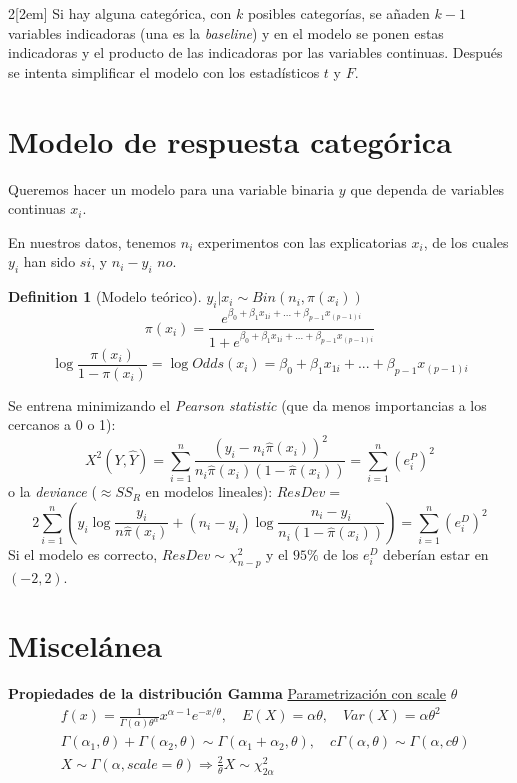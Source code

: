 \documentclass[leqno]{article}
\newtheorem*{definition}{Definition}
\begin{document}
\begin{multicols}{2}[\columnsep2em]
Si hay alguna categórica, con $k$ posibles categorías, se añaden $k-1$ variables indicadoras (una es la \textit{baseline}) y en el modelo se ponen estas indicadoras y el producto de las indicadoras por las variables continuas. Después se intenta simplificar el modelo con los estadísticos $t$ y $F$.




\section{Modelo de respuesta categórica}

Queremos hacer un modelo para una variable binaria $y$ que dependa de variables continuas $x_i$.

En nuestros datos, tenemos $n_i$ experimentos con las explicatorias $x_i$, de los cuales $y_i$ han sido $si$, y $n_i - y_i$ $no$.

\begin{definition}[Modelo teórico] $y_i | x_i \sim Bin(n_i, \pi(x_i))$
    \[
    \pi(x_i) = \frac{e^{\beta_0+\beta_1 x_{1i} + ... + \beta_{p-1} x_{(p-1)i}}}{1+e^{\beta_0+\beta_1 x_{1i} + ... + \beta_{p-1} x_{(p-1)i}}}
    \]
    \[
    \log \frac{\pi(x_i)}{1-\pi(x_i)} = \log Odds(x_i) = \beta_0+\beta_1 x_{1i} + ... + \beta_{p-1} x_{(p-1)i}
    \]
\end{definition}

Se entrena minimizando el \textit{Pearson statistic} (que da menos importancias a los cercanos a 0 o 1):
    \[
    X^2(Y, \hat Y) = \sum_{i=1}^n \frac{(y_i - n_i\hat\pi(x_i))^2}{n_i\hat\pi(x_i)(1-\hat\pi(x_i))} = \sum_{i=1}^n \left(e_i^P\right)^2
    \]
o la \textit{deviance} ($\approx SS_R$ en modelos lineales): $ResDev =$
    \[
    2\sum_{i=1}^n \left(y_i\log\frac{y_i}{n\hat\pi(x_i)} + (n_i-y_i)\log\frac{n_i-y_i}{n_i(1-\hat\pi(x_i))} \right) = \sum_{i=1}^n \left(e_i^D\right)^2
    \]
Si el modelo es correcto, $ResDev \sim \chi^2_{n-p}$ y el $95\%$ de los $e_i^D$ deberían estar en $(-2, 2)$.



\section{Miscelánea}

\textbf{Propiedades de la distribución Gamma}
\underline{Parametrización con scale} $\theta$
\begin{align*}
& f(x) = \frac{1}{\Gamma(\alpha)\theta ^\alpha} x^{\alpha-1} e^{-x/\theta}, \quad
E(X) = \alpha \theta , \quad Var(X) = \alpha \theta^2 \\
& \Gamma (\alpha_1, \theta) + \Gamma (\alpha_2, \theta) \sim \Gamma (\alpha_1+\alpha_2, \theta), \quad c\Gamma (\alpha, \theta) \sim \Gamma (\alpha, c\theta) \\
& X \sim \Gamma(\alpha, scale=\theta) \Rightarrow \frac{2}{\theta} X \sim \chi^2_{2\alpha}
\end{align*}


\end{multicols}
\end{document}
